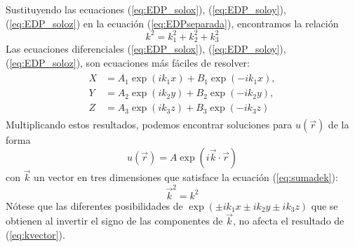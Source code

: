 Sustituyendo las ecuaciones (\ref{eq:EDP_solox}), (\ref{eq:EDP_soloy}), (\ref{eq:EDP_soloz}) en la ecuación (\ref{eq:EDPseparada}), encontramos la relación
\begin{equation}
k^{2} = k^{2}_{1} + k^{2}_{2} + k^{2}_{3} \label{eq:sumadek}
\end{equation}
Las ecuaciones diferenciales (\ref{eq:EDP_solox}), (\ref{eq:EDP_soloy}), (\ref{eq:EDP_soloz}), son ecuaciones más fáciles de resolver:
\begin{eqnarray}
\begin{aligned}
X &= A_{1} \exp(i k_{1} x) + B_{1} \exp(-i k_{1} x), \\
Y &= A_{2} \exp(i k_{2} y) + B_{2} \exp(-i k_{2} y), \\
Z &= A_{3} \exp(i k_{3} z) + B_{3} \exp(-i k_{3} z)
\end{aligned}  
\end{eqnarray}
Multiplicando estos resultados, podemos encontrar soluciones para $u(\overrightarrow{r})$ de la forma
\begin{equation}
u(\overrightarrow{r}) = A \exp(i \overrightarrow{k} \cdot \overrightarrow{r})
\end{equation}
con $\overrightarrow{k}$ un vector en tres dimensiones que satisface la ecuación (\ref{eq:sumadek}):
\begin{equation}
\overrightarrow{k}^{2} = k^{2} \label{eq:kvector}
\end{equation}
Nótese que las diferentes posibilidades de $\exp(\pm ik_{1} x \pm i k_{2} y \pm i k_{3} z)$ que se obtienen al invertir el signo de las componentes de $\overrightarrow{k}$, no afecta el resultado de (\ref{eq:kvector}).

